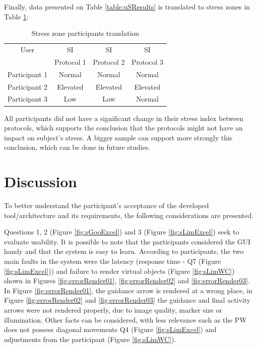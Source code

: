 Finally, data presented on Table \ref{table:uSResults} is translated to stress zones in Table \ref{table:trcSZ}:

\begin{table}[!htb]
\caption{Stress zone participants translation}\label{table:trcSZ}
\centering
\begin{tabular}{cccc}
\toprule
User & SI & SI & SI\\
& Protocol 1 & Protocol 2 & Protocol 3\\
\midrule
Participant  1 & Normal & Normal & Normal \\
Participant  2 & Elevated & Elevated & Elevated \\
Participant  3 & Low & Low & Normal \\
\bottomrule
\end{tabular}
\end{table}

All participants did not have a significant change in their stress index between protocols, which supports the conclusion that the protocols might not have an impact on subject’s stress. A bigger sample can support more strongly this conclusion, which can be done in future studies.

\section{Discussion}
\label{sec:discussion}

To better understand the participant's acceptance of the developed tool/architecture and its requirements, the following considerations are presented.

Questions 1, 2  (Figure \ref{fig:sGooExcel}) and 3  (Figure \ref{fig:sLimExcel})  seek to evaluate usability. It is possible to note that the participants considered the GUI handy and that the system is easy to learn. According to participants, the two main faults in the system were the latency (response time - Q7 (Figure \ref{fig:sLimExcel})) and failure to render virtual objects  (Figure \ref{fig:sLimWC}) shown in Figures \ref{fig:errorRender01}, \ref{fig:errorRender02} and \ref{fig:errorRender03}.  
In Figure \ref{fig:errorRender01}, the guidance arrow is rendered at a wrong place, in Figure \ref{fig:errorRender02} and \ref{fig:errorRender03} the guidance and final activity arrows were not rendered properly, due to image quality, marker size or illumination. Other facts can be considered, with less relevance such as the PW does not possess diagonal movements Q4  (Figure \ref{fig:sLimExcel})  and adjustments from the participant  (Figure \ref{fig:sLimWC}).

